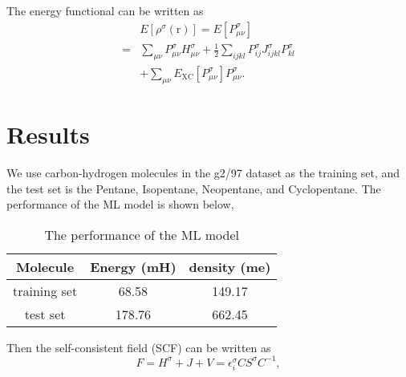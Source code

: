 \documentclass[%
twocolumn,
amsmath,amssymb,
groupedaddress,
reprint,%
]{revtex4-2}
\renewcommand{\>}{\rangle}
\newcommand{\<}{\langle}
\newcommand{\nl}{\nonumber \\}
\newcommand{\XC}{\mathrm{XC}}
\newcommand{\brm}[1]{\bm{\mathrm{#1}}}
\begin{document}
The energy functional can be written as
\begin{align}
      & E[\rho^{{\sigma}}(\brm{r})] = E[P^{\sigma}_{\mu \nu}] \nl
    = & \sum_{\mu \nu} P^{\sigma}_{\mu \nu} H^{\sigma}_{\mu \nu} + \frac{1}{2} \sum_{ijkl} P^{\sigma}_{ij} J^{\sigma}_{ijkl} P^{\sigma}_{kl}  \nl
      & + \sum_{\mu \nu}  E_{\XC}[P^{\sigma}_{\mu \nu}] P^{\sigma}_{\mu \nu}.
\end{align}

\section{Results}
We use carbon-hydrogen molecules in the g2/97 dataset as the training set, and the test set is the Pentane, Isopentane, Neopentane, and Cyclopentane.
%
The performance of the ML model is shown below,
\begin{table}[h]
    \centering
    \begin{tabular}{c|c|c}
        \hline
        Molecule     & Energy (mH) & density (me) \\
        \hline
        training set & 68.58       & 149.17       \\
        test set     & 178.76      & 662.45       \\
        \hline
    \end{tabular}
    \caption{The performance of the ML model}
\end{table}

Then the self-consistent field (SCF) can be written as
\begin{equation}
    F = H^{\sigma} + J + V = \epsilon^{\sigma}_{i} C S^{\sigma} C^{-1},
\end{equation}
\end{document}
